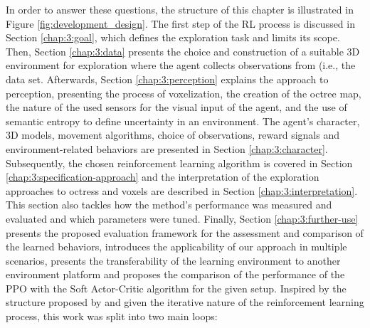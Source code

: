 In order to answer these questions, the structure of this chapter is illustrated in Figure \ref{fig:development_design}.
The first step of the RL process is discussed in Section \ref{chap:3:goal}, which defines the exploration task and limits its scope. 
Then, Section \ref{chap:3:data} presents the choice and construction of a suitable 3D environment for exploration where the agent collects observations from (i.e., the data set.
Afterwards, Section \ref{chap:3:perception} explains the approach to perception, presenting the process of voxelization, the creation of the octree map, the nature of the used sensors for the visual input of the agent, and the use of semantic entropy to define uncertainty in an environment.
% 
The agent's character, 3D models, movement algorithms, choice of observations, reward signals and environment-related behaviors are presented in Section \ref{chap:3:character}.
Subsequently, the chosen reinforcement learning algorithm is covered in Section \ref{chap:3:specification-approach} and the interpretation of the exploration approaches to octress and voxels are described in Section \ref{chap:3:interpretation}. 
This section also tackles how the method's performance was measured and evaluated and which parameters were tuned.
Finally, Section \ref{chap:3:further-use} presents the proposed evaluation framework for the assessment and comparison of the learned behaviors, introduces the applicability of our approach in multiple scenarios, presents the transferability of the learning environment to another environment platform and proposes the comparison of the performance of the PPO with the Soft Actor-Critic algorithm for the given setup.
Inspired by the structure proposed by \textcite{luckert2016using} and given the iterative nature of the reinforcement learning process, this work was split into two main loops:
